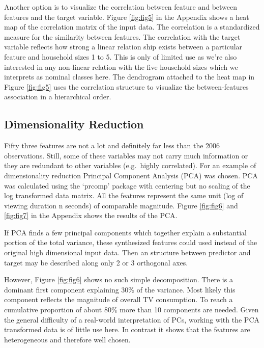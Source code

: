 \documentclass[]{article}
\begin{document}
Another option is to visualize the correlation between feature and
between features and the target variable. Figure \ref{fig:fig5} in the
Appendix shows a heat map of the correlation matrix of the input data.
The correlation is a standardized measure for the similarity between
features. The correlation with the target variable reflects how strong a
linear relation ship exists between a particular feature and household
sizes 1 to 5. This is only of limited use as we're also interested in
any non-linear relation with the five household sizes which we
interprets as nominal classes here. The dendrogram attached to the heat
map in Figure \ref{fig:fig5} uses the correlation structure to visualize
the between-features association in a hierarchical order.

\hypertarget{dimensionality-reduction}{%
\subsection{Dimensionality Reduction}\label{dimensionality-reduction}}

Fifty three features are not a lot and definitely far less than the 2006
observations. Still, some of these variables may not carry much
information or they are redundant to other variables (e.g.~highly
correlated). For an example of dimensionality reduction Principal
Component Analysis (PCA) was chosen. PCA was calculated using the
`prcomp' package with centering but no scaling of the log transformed
data matrix. All the features represent the same unit (log of viewing
duration n seconds) of comparable magnitude. Figure \ref{fig:fig6} and
\ref{fig:fig7} in the Appendix shows the results of the PCA.

If PCA finds a few principal components which together explain a
substantial portion of the total variance, these synthesized features
could used instead of the original high dimensional input data. Then an
structure between predictor and target may be described along only 2 or
3 orthogonal axes.

However, Figure \ref{fig:fig6} shows no such simple decomposition. There
is a dominant first component explaining 30\% of the variance. Most
likely this component reflects the magnitude of overall TV consumption.
To reach a cumulative proportion of about 80\% more than 10 components
are needed. Given the general difficulty of a real-world interpretation
of PCs, working with the PCA transformed data is of little use here. In
contrast it shows that the features are heterogeneous and therefore well
chosen.
\end{document}
